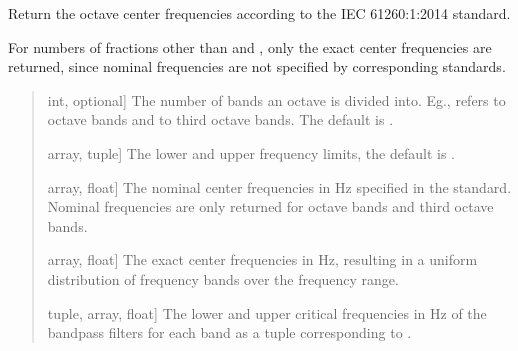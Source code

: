 \documentclass[letterpaper,10pt,english]{sphinxmanual}
\begin{document}
\begin{fulllineitems}
\label{\detokenize{modules/dsptoolbox.standard_functions:dsptoolbox.standard_functions.fractional_octave_frequencies}}
\pysigstartsignatures
{}
\pysigstopsignatures
\sphinxAtStartPar
Return the octave center frequencies according to the IEC 61260:1:2014
standard.

\sphinxAtStartPar
For numbers of fractions other than  and , only the
exact center frequencies are returned, since nominal frequencies are not
specified by corresponding standards.
\begin{quote}\begin{description}
\begin{description}
\sphinxlineitem{\sphinxstylestrong{num\_fractions}}{[}int, optional{]}
\sphinxAtStartPar
The number of bands an octave is divided into. Eg.,  refers to
octave bands and  to third octave bands. The default is .

\sphinxlineitem{\sphinxstylestrong{frequency\_range}}{[}array, tuple{]}
\sphinxAtStartPar
The lower and upper frequency limits, the default is
.

\end{description}

\begin{description}
\sphinxlineitem{\sphinxstylestrong{nominal}}{[}array, float{]}
\sphinxAtStartPar
The nominal center frequencies in Hz specified in the standard.
Nominal frequencies are only returned for octave bands and third octave
bands.

\sphinxlineitem{\sphinxstylestrong{exact}}{[}array, float{]}
\sphinxAtStartPar
The exact center frequencies in Hz, resulting in a uniform distribution
of frequency bands over the frequency range.

\sphinxlineitem{\sphinxstylestrong{cutoff\_freq}}{[}tuple, array, float{]}
\sphinxAtStartPar
The lower and upper critical frequencies in Hz of the bandpass filters
for each band as a tuple corresponding to .


\end{description}
\end{description}
\end{quote}
\end{fulllineitems}
\end{document}
